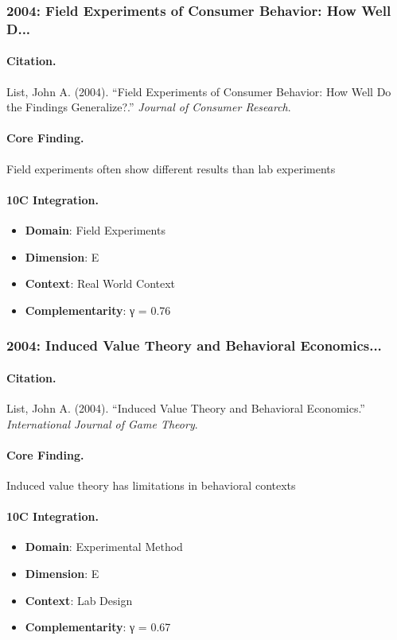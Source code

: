 \subsubsection{2004: Field Experiments of Consumer Behavior: How Well D...}

\paragraph{Citation.}
List, John A. (2004). ``Field Experiments of Consumer Behavior: How Well Do the Findings Generalize?.''
\textit{Journal of Consumer Research}.

\paragraph{Core Finding.}
Field experiments often show different results than lab experiments

\paragraph{10C Integration.}
\begin{itemize}[nosep]
  \item \textbf{Domain}: Field Experiments
  \item \textbf{Dimension}: E
  \item \textbf{Context}: Real World Context
  \item \textbf{Complementarity}: γ = 0.76
\end{itemize}


\subsubsection{2004: Induced Value Theory and Behavioral Economics...}

\paragraph{Citation.}
List, John A. (2004). ``Induced Value Theory and Behavioral Economics.''
\textit{International Journal of Game Theory}.

\paragraph{Core Finding.}
Induced value theory has limitations in behavioral contexts

\paragraph{10C Integration.}
\begin{itemize}[nosep]
  \item \textbf{Domain}: Experimental Method
  \item \textbf{Dimension}: E
  \item \textbf{Context}: Lab Design
  \item \textbf{Complementarity}: γ = 0.67
\end{itemize}


